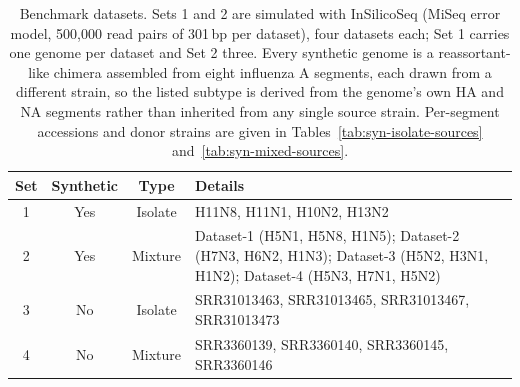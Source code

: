 %

\begin{table}
\centering
\begin{tabular}{cccp{}}
\toprule
\textbf{Set}	& \textbf{Synthetic}	& \textbf{Type}	& \textbf{Details} \\
\midrule
1		& Yes			& Isolate	& H11N8, H11N1, H10N2, H13N2 \\
2		& Yes			& Mixture	& Dataset-1 (H5N1, H5N8, H1N5); Dataset-2 (H7N3, H6N2, H1N3); Dataset-3 (H5N2, H3N1, H1N2); Dataset-4 (H5N3, H7N1, H5N2) \\
3		& No			& Isolate	& SRR31013463, SRR31013465, SRR31013467, SRR31013473 \\
4		& No			& Mixture	& SRR3360139, SRR3360140, SRR3360145, SRR3360146 \\
\bottomrule
\end{tabular}
\caption{Benchmark datasets. Sets 1 and 2 are simulated with InSilicoSeq (MiSeq
error model, 500{,}000 read pairs of 301\,bp per dataset), four datasets each;
Set 1 carries one genome per dataset and Set 2 three. Every synthetic genome is a
reassortant-like chimera assembled from eight influenza A segments, each drawn
from a different strain, so the listed subtype is derived from the genome's own
HA and NA segments rather than inherited from any single source strain. Per-segment
accessions and donor strains are given in
Tables~\ref{tab:syn-isolate-sources} and~\ref{tab:syn-mixed-sources}.
\label{tab:datasets}}
\end{table}

